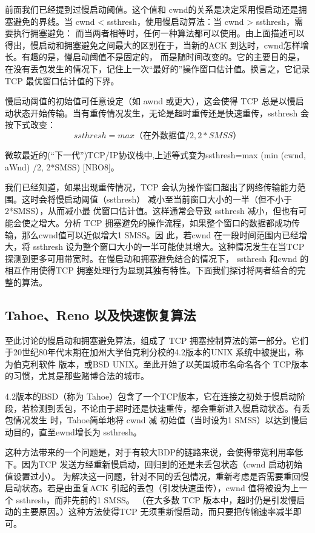 前面我们已经提到过慢启动阈值。这个值和 cwnd的关系是决定采用慢启动还是拥塞避免的界线。当 cwnd < ssthresh，使用慢启动算法：当 cwnd > ssthresh，需要执行拥塞避免：
而当两者相等时，任何一种算法都可以使用。由上面描述可以得出，慢启动和拥塞避免之间最大的区别在于，当新的ACK 到达时，cwnd怎样增长。有趣的是，慢启动阈值不是固定的，
而是随时间改变的。它的主要目的是，在没有丢包发生的情况下，记住上一次“最好的”操作窗口估计值。换言之，它记录 TCP 最优窗口估计值的下界。

慢启动阈值的初始值可任意设定（如 awnd 或更大），这会使得 TCP 总是以慢启动状态开始传输。当有重传情况发生，无论是超时重传还是快速重传，ssthresh 会按下式改变：
\begin{equation}
    ssthresh = max（在外数据值 /2, 2*SMSS）
\end{equation}

\begin{tcolorbox}
    微软最近的(“下一代”)TCP/IP协议栈中,上述等式变为ssthresh=max (min (cwnd, aWnd) /2, 2*SMSS) [NBO8]。
\end{tcolorbox}
我们已经知道，如果出现重传情况，TCP 会认为操作窗口超出了网络传输能力范围。这时会将慢启动阈值（ssthresh） 减小至当前窗口大小的一半（但不小于 2*SMSS），从而减小最
优窗口估计值。这样通常会导致 ssthresh 减小，但也有可能会使之增大。分析 TCP 拥塞避免的操作流程，如果整个窗口的数据都成功传输，那么cwnd值可以近似增大1 SMSS。因
此，若cwnd 在一段时间范围内已经增大，将 ssthresh 设为整个窗口大小的一半可能使其增大。这种情况发生在当TCP 探测到更多可用带宽时。在慢启动和拥塞避免结合的情况下，
ssthresh 和cwnd 的相互作用使得TCP 拥塞处理行为显现其独有特性。下面我们探讨将两者结合的完整的算法。

\subsection{Tahoe、Reno 以及快速恢复算法}
至此讨论的慢启动和拥塞避免算法，组成了 TCP 拥塞控制算法的第一部分。它们于20世纪80年代末期在加州大学伯克利分校的4.2版本的UNIX 系统中被提出，称为伯克利软件
版本，或BSD UNIX。至此开始了以美国城市名命名各个 TCP版本的习惯，尤其是那些赌博合法的城市。

4.2版本的BSD（称为 Tahoe）包含了一个TCP版本，它在连接之初处于慢启动阶段，若检测到丢包，不论由于超时还是快速重传，都会重新进入慢启动状态。有丢包情况发生
时，Tahoe简单地将 cwnd 减 初始值（当时设为1 SMSS）以达到慢启动目的，直至ewnd增长为 ssthresh。

这种方法带来的一个问题是，对于有较大BDP的链路来说，会使得带宽利用率低下。因为TCP 发送方经重新慢启动，回归到的还是未丢包状态（cwnd 启动初始值设置过小）。
为解决这一问题，针对不同的丢包情况，重新考虑是否需要重回慢启动状态。若是由重复ACK 引起的丢包（引发快速重传），cwnd 值将被设为上一个 ssthresh，而非先前的1 SMSS。
（在大多数 TCP 版本中，超时仍是引发慢启动的主要原因。）这种方法使得TCP 无须重新慢启动，而只要把传输速率减半即可。

